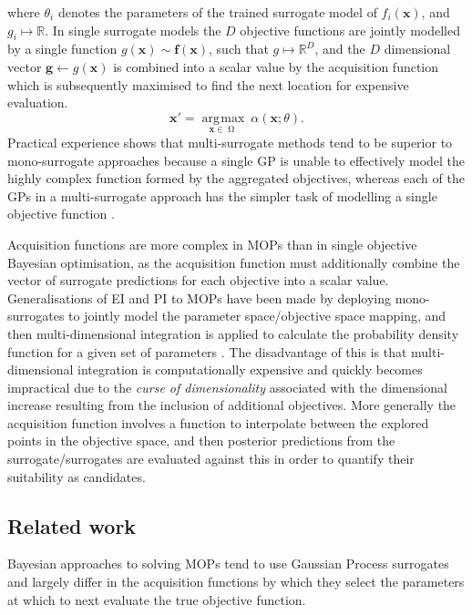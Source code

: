 \documentclass[conference]{IEEEtran}
\DeclareMathOperator*{\parameterspace}{\Omega}
\DeclareMathOperator*{\argmax}{\arg\!\max}
\newcommand\ei{EI\xspace}
\newcommand\gp{GP\xspace}
\newcommand{\bx}{\mathbf{x}}
\newcommand{\bff}{\mathbf{f}}
\begin{document}
where $\theta_i$ denotes the parameters of the trained surrogate model of $f_i(\bx)$, and $g_i \mapsto \mathbb{R}$. In single surrogate models the $D$ objective functions are jointly modelled by a single function $g(\bx) \sim \bff(\bx)$, such that $g \mapsto \mathbb{R}^D$, and the $D$ dimensional vector $ \mathbf{g} \gets g(\bx)$ is combined into a scalar value by the acquisition function which is subsequently maximised to find the next location for expensive evaluation.
\begin{equation}\label{eqn: eqn: max_alpha_monosurrogate}
   \bx' = \underset{\mathbf{x}\in \parameterspace}{\argmax}\:\alpha(\mathbf{x}; \theta).
\end{equation}
Practical experience shows that multi-surrogate methods tend to be superior to mono-surrogate approaches because a single \gp is unable to effectively model the highly complex function formed by the aggregated objectives, whereas each of the GPs in a multi-surrogate approach has the simpler task of modelling a single objective function \cite{rahat2017alternative}. 

Acquisition functions are more complex in MOPs than in single objective Bayesian optimisation, as the acquisition function must additionally combine the vector of surrogate predictions for each objective into a scalar value. Generalisations of \ei and PI to MOPs have been made by deploying mono-surrogates to jointly model the parameter space/objective space mapping, and then multi-dimensional integration is applied to calculate the probability density function for a given set of parameters \cite{emmerich2006single,keane2006statistical}. The disadvantage of this is that multi-dimensional integration is computationally expensive and quickly becomes impractical due to the \textit{curse of dimensionality} associated with the dimensional increase resulting from the inclusion of additional objectives. More generally the acquisition function involves a function to interpolate between the explored points in the objective space, and then posterior predictions from the surrogate/surrogates are evaluated against this in order to quantify their suitability as candidates. 

\subsection{Related work}\label{section:related_work}
Bayesian approaches to solving MOPs tend to use Gaussian Process surrogates and largely differ in the acquisition functions by which they select the parameters at which to next evaluate the true objective function.
\end{document}
